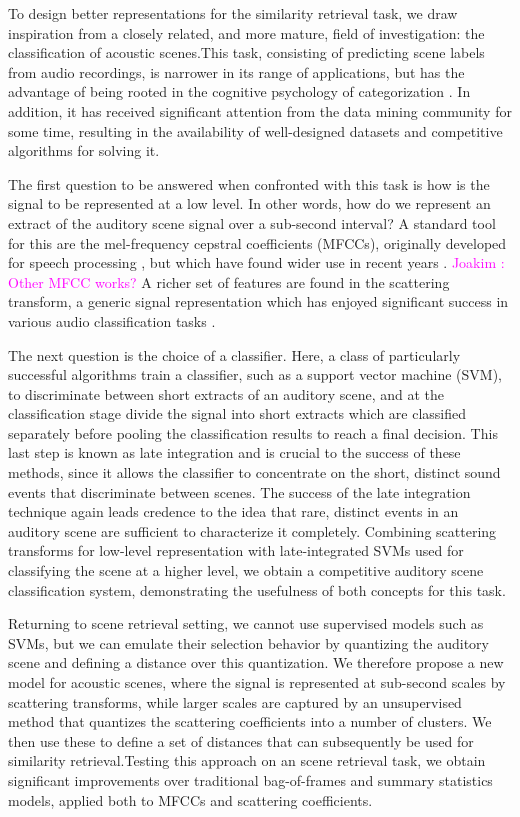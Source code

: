 \documentclass[journal]{IEEEtran}
\newcommand{\ja}[1]{\textcolor{magenta}{Joakim : #1}}
\begin{document}
To design better representations for the similarity retrieval task, we draw inspiration from a closely related, and more mature, field of investigation: the classification of acoustic scenes.This task, consisting of predicting scene labels from audio recordings, is narrower in its range of applications, but has the advantage of being rooted in the cognitive psychology of categorization \cite{dubois2006cognitive,guastavino_ideal_2006}. In addition, it has received significant attention from the data mining community for some time, resulting in the availability of well-designed datasets and competitive algorithms for solving it.

The first question to be answered when confronted with this task is how is the signal to be represented at a low level. In other words, how do we represent an extract of the auditory scene signal over a sub-second interval? A standard tool for this are the mel-frequency cepstral coefficients (MFCCs), originally developed for speech processing \cite{davis-mermelstein}, but which have found wider use in recent years \cite{logan}. \ja{Other MFCC works?} A richer set of features are found in the scattering transform, a generic signal representation which has enjoyed significant success in various audio classification tasks \cite{Anden2014}.

The next question is the choice of a classifier. Here, a class of particularly successful algorithms train a classifier, such as a support vector machine (SVM), to discriminate between short extracts of an auditory scene, and at the classification stage divide the signal into short extracts which are classified separately before pooling the classification results to reach a final decision. This last step is known as late integration and is crucial to the success of these methods, since it allows the classifier to concentrate on the short, distinct sound events that discriminate between scenes. The success of the late integration technique again leads credence to the idea that rare, distinct events in an auditory scene are sufficient to characterize it completely. Combining scattering transforms for low-level representation with late-integrated SVMs used for classifying the scene at a higher level, we obtain a competitive auditory scene classification system, demonstrating the usefulness of both concepts for this task.

Returning to scene retrieval setting, we cannot use supervised models such as SVMs, but we can emulate their selection behavior by quantizing the auditory scene and defining a distance over this quantization. We therefore propose a new model for acoustic scenes, where the signal is represented at sub-second scales by scattering transforms, while larger scales are captured by an unsupervised method that quantizes the scattering coefficients into a number of clusters. We then use these to define a set of distances that can subsequently be used for similarity retrieval.Testing this approach on an scene retrieval task, we obtain significant improvements over traditional bag-of-frames and summary statistics models, applied both to MFCCs and scattering coefficients.
\end{document}
